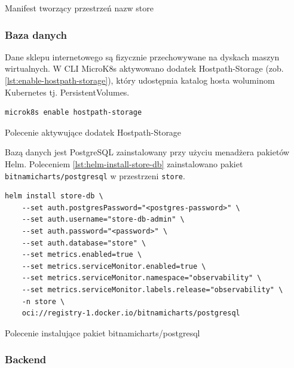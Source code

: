 \begin{listing}[H]
    \inputminted[xleftmargin=20pt,linenos]{yaml}{code/store-namespace.yaml}
    \caption{Manifest tworzący przestrzeń nazw store}
    \label{lst:store-namespace}
\end{listing}

\subsubsection{Baza danych}\label{subsubsec:baza-danych}

Dane sklepu internetowego są fizycznie przechowywane na dyskach maszyn wirtualnych.
W CLI MicroK8s aktywowano dodatek Hostpath-Storage (zob. \autoref{lst:enable-hostpath-storage}), który udostępnia katalog hosta woluminom Kubernetes tj. PersistentVolumes.

\begin{listing}[H]
    \begin{verbatim}
microk8s enable hostpath-storage
    \end{verbatim}
    \caption{Polecenie aktywujące dodatek Hostpath-Storage}
    \label{lst:enable-hostpath-storage}
\end{listing}

\noindent Bazą danych jest PostgreSQL zainstalowany przy użyciu menadżera pakietów Helm.
Poleceniem \autoref{lst:helm-install-store-db} zainstalowano pakiet \texttt{bitnamicharts/postgresql} w przestrzeni \texttt{store}.

\begin{listing}[H]
    \begin{verbatim}
helm install store-db \
    --set auth.postgresPassword="<postgres-password>" \
    --set auth.username="store-db-admin" \
    --set auth.password="<password>" \
    --set auth.database="store" \
    --set metrics.enabled=true \
    --set metrics.serviceMonitor.enabled=true \
    --set metrics.serviceMonitor.namespace="observability" \
    --set metrics.serviceMonitor.labels.release="observability" \
    -n store \
    oci://registry-1.docker.io/bitnamicharts/postgresql
    \end{verbatim}
    \caption{Polecenie instalujące pakiet bitnamicharts/postgresql}
    \label{lst:helm-install-store-db}
\end{listing}

\subsubsection{Backend}


